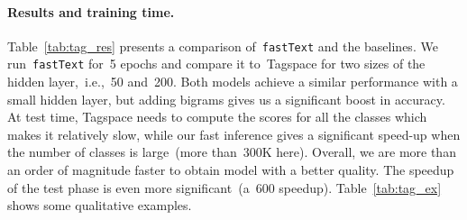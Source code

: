 \paragraph{Results and training time.}
Table~\ref{tab:tag_res} presents a comparison of~\texttt{fastText} and the baselines.
We run~\texttt{fastText} for~5 epochs and compare it to~Tagspace for two sizes of the
hidden layer,~i.e.,~50 and~200.
Both models achieve a similar performance with a small hidden layer, but adding
bigrams gives us a significant boost in accuracy. At test
time, Tagspace needs to compute the scores for all the classes which makes it
relatively slow, while our fast inference gives a significant speed-up when the
number of classes is large~(more than~300K here). Overall, we are more than an order of magnitude
faster to obtain model with a better quality. The speedup of the test phase is
even more significant~(a~600 speedup). Table~\ref{tab:tag_ex} shows
some qualitative examples.
